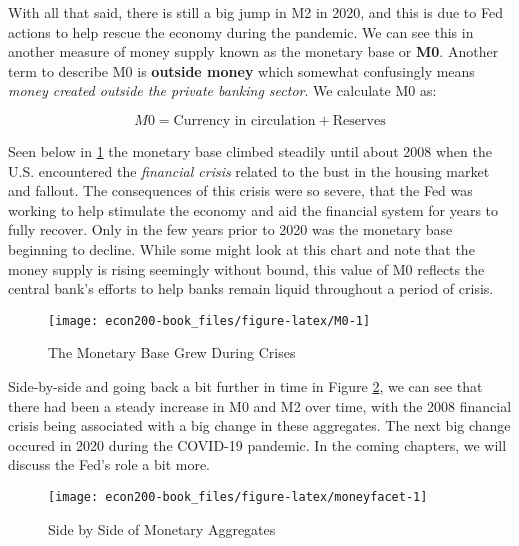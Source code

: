 \documentclass[
]{book}
\begin{document}
With all that said, there is still a big jump in M2 in 2020, and this is due to Fed actions to help rescue the economy during the pandemic. We can see this in another measure of money supply known as the monetary base or \textbf{M0}. Another term to describe M0 is \textbf{outside money} which somewhat confusingly means \emph{money created outside the private banking sector}. We calculate M0 as:

\begin{equation}
M0 = \text{Currency in circulation} + \text{Reserves} \label{eq:M0}
\end{equation}

Seen below in \ref{fig:M0} the monetary base climbed steadily until about 2008 when the U.S. encountered the \emph{financial crisis} related to the bust in the housing market and fallout. The consequences of this crisis were so severe, that the Fed was working to help stimulate the economy and aid the financial system for years to fully recover. Only in the few years prior to 2020 was the monetary base beginning to decline. While some might look at this chart and note that the money supply is rising seemingly without bound, this value of M0 reflects the central bank's efforts to help banks remain liquid throughout a period of crisis.

\begin{figure}

{\centering \texttt{[image: econ200-book\_files/figure-latex/M0-1]} 

}

\caption{The Monetary Base Grew During Crises}\label{fig:M0}
\end{figure}

Side-by-side and going back a bit further in time in Figure \ref{fig:moneyfacet}, we can see that there had been a steady increase in M0 and M2 over time, with the 2008 financial crisis being associated with a big change in these aggregates. The next big change occured in 2020 during the COVID-19 pandemic. In the coming chapters, we will discuss the Fed's role a bit more.

\begin{figure}

{\centering \texttt{[image: econ200-book\_files/figure-latex/moneyfacet-1]} 

}

\caption{Side by Side of Monetary Aggregates}\label{fig:moneyfacet}
\end{figure}
\end{document}
